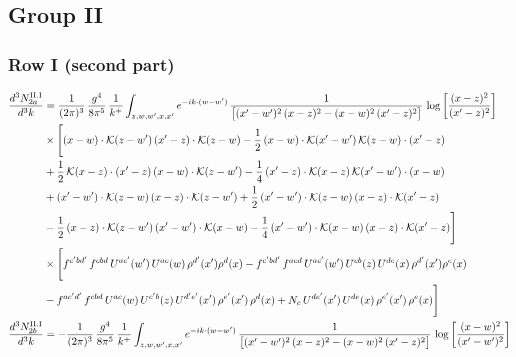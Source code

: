 \documentclass[9pt]{article}
\numberwithin{equation}{section}
\begin{document}
\subsection{Group II}
\subsubsection*{Row I (second part)}
\begin{align}
\frac{d^{3}N^{\rm II.I}_{2a}}{d^{3}k}&=\frac{1}{(2\pi)^{3}}\,\frac{g^{4}}{8\pi^{5}}\,\frac{1}{k^{+}}\int_{z,w,w^{\prime},x,x^{\prime}}e^{-ik\cdot(w-w^{\prime})}\,\frac{1}{\big[(x^{\prime}-w^{\prime})^{2}\,(x-z)^{2}-(x-w)^{2}\,(x^{\prime}-z)^{2}\big]}\,\log\left[\frac{(x-z)^{2}}{(x^{\prime}-z)^{2}}\right]\notag\\
&\times\Bigg[(x-w)\cdot\mathcal{K}(z-w^{\prime})\,(x^{\prime}-z)\cdot\mathcal{K}(z-w)-\frac{1}{2}\,(x-w)\cdot\mathcal{K}(x^{\prime}-w^{\prime})\,\mathcal{K}(z-w)\cdot(x^{\prime}-z)\notag \\ & +\frac{1}{2}\,\mathcal{K}(x-z)\cdot(x^{\prime}-z)\,(x-w)\cdot\mathcal{K}(z-w^{\prime}) -\frac{1}{4}\,(x^{\prime}-z)\cdot\mathcal{K}(x-z)\,\mathcal{K}(x^{\prime}-w^{\prime})\cdot(x-w)\notag \\ & +(x^{\prime}-w^{\prime})\cdot\mathcal{K}(z-w)\,(x-z)\cdot\mathcal{K}(z-w^{\prime})+\frac{1}{2}\,(x^{\prime}-w^{\prime})\cdot\mathcal{K}(z-w)\,(x-z)\cdot\mathcal{K}(x^{\prime}-z)\notag \\ & -\frac{1}{2}\,(x-z)\cdot\mathcal{K}(z-w^{\prime})\,(x^{\prime}-w^{\prime})\cdot\mathcal{K}(x-w)-\frac{1}{4}\,(x^{\prime}-w^{\prime})\cdot\mathcal{K}(x-w)\,(x-z)\cdot\mathcal{K}(x^{\prime}-z)\Bigg]\notag \\ & \times\Bigg[f^{c^{\prime}bd^{\prime}}\,f^{cbd}\, U^{ac^{\prime}}(w^{\prime})\,U^{ac}(w)\,\rho^{d^{\prime}}(x^{\prime})\rho^{d}(x)- f^{c^{\prime}bd^{\prime}}\,f^{acd}\,U^{ac^{\prime}}(w^{\prime})\,U^{cb}(z)\,U^{de}(x)\,\rho^{d^{\prime}}(x^{\prime})\rho^{e}(x) \notag \\ & -f^{ac^{\prime}d^{\prime}}\,f^{cbd}\,U^{ac}(w)\,U^{c^{\prime}b}(z)\,U^{d^{\prime}e^{\prime}}(x^{\prime})\,\rho^{e^{\prime}}(x^{\prime})\,\rho^{d}(x) +N_{c}\,U^{de^{\prime}}(x^{\prime})\,U^{de}(x)\,\rho^{e^{\prime}}(x^{\prime})\,\rho^{e}(x)\Bigg]\label{eq:B-II2a}\\
\frac{d^{3}N^{\rm II.I}_{2b}}{d^{3}k}&= -\frac{1}{(2\pi)^{3}}\,\frac{g^{4}}{8\pi^{5}}\,\frac{1}{k^{+}}\int_{z,w,w^{\prime},x,x^{\prime}}e^{-ik\cdot(w-w^{\prime})}\,\frac{1}{\big[(x^{\prime}-w^{\prime})^{2}\,(x-z)^{2}-(x-w)^{2}\,(x^{\prime}-z)^{2}\big]}\,\log\left[\frac{(x-w)^{2}}{(x^{\prime}-w^{\prime})^{2}}\right]\notag\\

\end{align}
\end{document}
